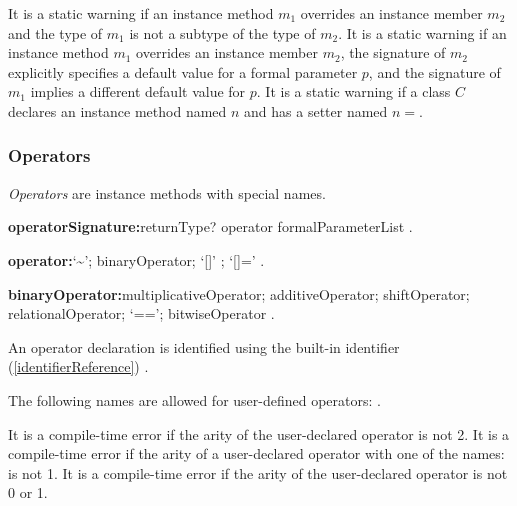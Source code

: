\documentclass{article}
\begin{document}

\LMHash{}
It is a static warning if an instance method $m_1$ overrides an instance member $m_2$ and the type of $m_1$ is not a subtype of the type of $m_2$.
It is a static warning if an instance method $m_1$ overrides an instance member $m_2$, the signature of $m_2$ explicitly specifies a default value for a formal parameter $p$, and the signature of $m_1$ implies a different default value for $p$.
It is a static warning if a class $C$ declares an instance method named $n$ and has a setter named $n=$.



\subsubsection{Operators}

\LMHash{}
{\em Operators} are instance methods with special names.

\begin{grammar}
{\bf operatorSignature:}returnType? \OPERATOR{} operator formalParameterList
  .

{\bf operator:}`\~{}';
  binaryOperator;
  `[]' ;
  `[]='
  .

{\bf binaryOperator:}multiplicativeOperator;
  additiveOperator;
  shiftOperator;
  relationalOperator;
  `==';
  bitwiseOperator
  .
\end{grammar}

\LMHash{}
An operator declaration is identified using the built-in identifier (\ref{identifierReference}) \OPERATOR{}.

\LMHash{}
The following names are allowed for user-defined operators: \code{<, >, <=, >=, ==, -, +, /, \~{}/, *, \%, $|$, \^{}, \&, $<<$, $>>$, $>>>$, []=, [], \~{}}.

\LMHash{}
It is a compile-time error if the arity of the user-declared operator \code{[]=} is not 2.
It is a compile-time error if the arity of a user-declared operator with one of the names: \code{<, >, <=, >=, ==, -, +, \~{}/, /, *, \%, $|$, \^{}, \&, $<<$, $>>$, $>>>$, []} is not 1.
It is a compile-time error if the arity of the user-declared operator \code{-} is not 0 or 1.
\end{document}

